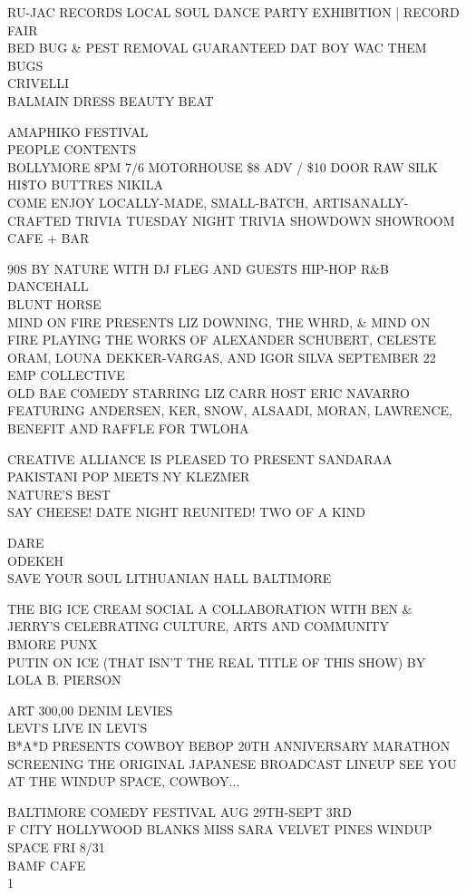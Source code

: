 \documentclass[10pt,letterpaper]{article}
\begin{document}
RU{-}JAC RECORDS LOCAL SOUL DANCE PARTY EXHIBITION | RECORD FAIR\\
BED BUG \& PEST REMOVAL GUARANTEED DAT BOY WAC THEM BUGS\\
CRIVELLI\\
BALMAIN DRESS BEAUTY BEAT

AMAPHIKO FESTIVAL\\
PEOPLE CONTENTS\\
BOLLYMORE 8PM 7/6 MOTORHOUSE \$8 ADV / \$10 DOOR RAW SILK HI\$TO BUTTRES NIKILA\\
COME ENJOY LOCALLY{-}MADE, SMALL{-}BATCH, ARTISANALLY{-}CRAFTED TRIVIA TUESDAY NIGHT TRIVIA SHOWDOWN SHOWROOM CAFE + BAR

90S BY NATURE WITH DJ FLEG AND GUESTS HIP{-}HOP R\&B DANCEHALL\\
BLUNT HORSE\\
MIND ON FIRE PRESENTS LIZ DOWNING, THE WHRD, \& MIND ON FIRE PLAYING THE WORKS OF ALEXANDER SCHUBERT, CELESTE ORAM, LOUNA DEKKER{-}VARGAS, AND IGOR SILVA SEPTEMBER 22 EMP COLLECTIVE\\
OLD BAE COMEDY STARRING LIZ CARR HOST ERIC NAVARRO FEATURING ANDERSEN, KER, SNOW, ALSAADI, MORAN, LAWRENCE, BENEFIT AND RAFFLE FOR TWLOHA

CREATIVE ALLIANCE IS PLEASED TO PRESENT SANDARAA PAKISTANI POP MEETS NY KLEZMER\\
NATURE'S BEST\\
SAY CHEESE!  DATE NIGHT  REUNITED!  TWO OF A KIND

DARE\\
ODEKEH\\
SAVE YOUR SOUL LITHUANIAN HALL BALTIMORE

THE BIG ICE CREAM SOCIAL A COLLABORATION WITH BEN \& JERRY'S CELEBRATING CULTURE, ARTS AND COMMUNITY\\
BMORE PUNX\\
PUTIN ON ICE (THAT ISN'T THE REAL TITLE OF THIS SHOW) BY LOLA B. PIERSON

ART 300,00 DENIM LEVIES\\
LEVI'S LIVE IN LEVI'S\\
B*A*D PRESENTS COWBOY BEBOP 20TH ANNIVERSARY MARATHON SCREENING THE ORIGINAL JAPANESE BROADCAST LINEUP SEE YOU AT THE WINDUP SPACE, COWBOY...

BALTIMORE COMEDY FESTIVAL AUG 29TH{-}SEPT 3RD\\
F CITY HOLLYWOOD BLANKS MISS SARA VELVET PINES WINDUP SPACE FRI 8/31\\
BAMF CAFE\\
1
\end{document}

